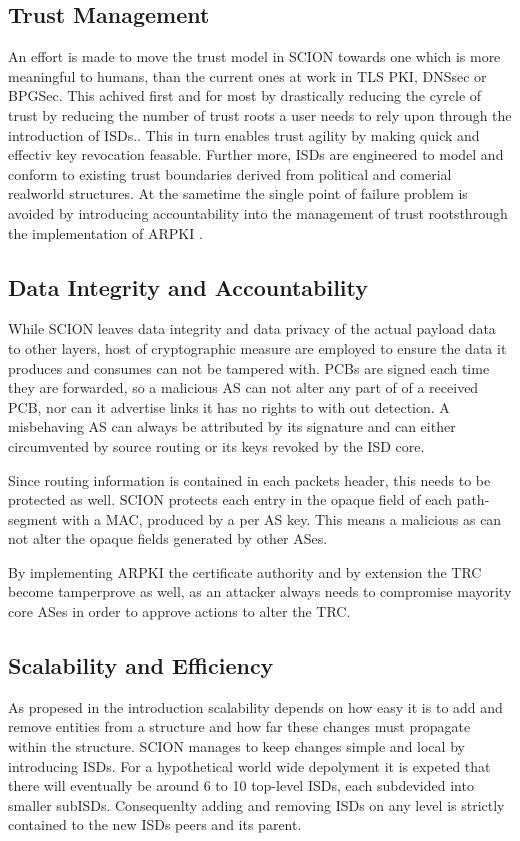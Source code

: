 \documentclass[../eva1_scion.tex]{subfiles}
\begin{document}
    \subsection{Trust Management}
    An effort is made to move the trust model in SCION towards one which is more meaningful to humans, than the current ones at work in TLS PKI, DNSsec or BPGSec. This achived first and for most by drastically reducing the cyrcle of trust by reducing the number of trust roots a user needs to rely upon through the introduction of ISDs.. This in turn enables trust agility by making quick and effectiv key revocation feasable. Further more, ISDs are engineered to model and conform to existing trust boundaries derived from political and comerial realworld structures. At the sametime the single point of failure problem is avoided by introducing accountability into the management of trust rootsthrough the implementation of ARPKI \cite{rpki}.

    \subsection{Data Integrity and Accountability}
    While SCION leaves data integrity and data privacy of the actual payload data to other layers, host of cryptographic measure are employed to ensure the data it produces and consumes can not be tampered with. PCBs are signed each time they are forwarded, so a malicious AS can not alter any part of of a received PCB, nor can it advertise links it has no rights to with out detection. A misbehaving AS can always be attributed by its signature and can either circumvented by source routing or its keys revoked by the ISD core.

    Since routing information is contained in each packets header, this needs to be protected as well. SCION protects each entry in the opaque field of each path-segment with a MAC, produced by a per AS key. This means a malicious as can not alter the opaque fields generated by other ASes.

    By implementing ARPKI \cite{arpki} the certificate authority and by extension the TRC become tamperprove as well, as an attacker always needs to compromise mayority core ASes in order to approve actions to alter the TRC.

    \subsection{Scalability and Efficiency}
    As propesed in the introduction scalability depends on how easy it is to add and remove entities from a structure and how far these changes must propagate within the structure. SCION manages to keep changes simple and local by introducing ISDs. For a hypothetical world wide depolyment it is expeted that there will eventually be around 6 to 10 \cite{scion_2011} top-level ISDs, each subdevided into smaller subISDs. Consequenlty adding and removing ISDs on any level is strictly contained to the new ISDs peers and its parent.
\end{document}
